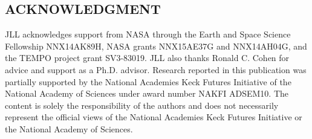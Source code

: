 \documentclass[a4paper,10pt,oneside]{article}
\begin{document}
\begin{sloppy}
\section{ACKNOWLEDGMENT}
\label{sec:ack}

JLL acknowledges support from NASA through the Earth and Space Science Fellowship NNX14AK89H, NASA grants NNX15AE37G and NNX14AH04G, and the TEMPO project grant SV3-83019.  JLL also thanks Ronald C. Cohen for advice and support as a Ph.D. advisor. Research reported in this publication was partially supported by the National Academies Keck Futures Initiative of the National Academy of Sciences under award number NAKFI ADSEM10. The content is solely the responsibility of the authors and does not necessarily represent the official views of the National Academies Keck Futures Initiative or the National Academy of Sciences.



\footnotesize{

}

\AtEndDocument{\par\leavevmode}
\end{sloppy}
\end{document}
